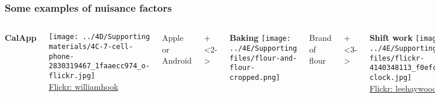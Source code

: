 \begin{frame}\frametitle{Some examples of nuisance factors}
	\begin{columns}[t]
			\textbf{CalApp}
			
			\texttt{[image: ../4D/Supporting materials/4C-7-cell-phone-2830319467\_1faaecc974\_o-flickr.jpg]}
			\\
			{\tiny{\href{https://secure.flickr.com/photos/williamhook/2830319467/}{Flickr: williamhook}}}
			
			\vspace{1cm}
			Apple or Android 
		
		
			\onslide+<2->{
				\textbf{Baking}
				\texttt{[image: ../4E/Supporting files/flour-and-flour-cropped.png]}
		
				\vspace{1.1cm}
				Brand of flour
			}
			
			\onslide+<3->{
				\textbf{Shift work}
				\texttt{[image: ../4E/Supporting files/flickr-4140348113\_f0efc8235b\_z-clock.jpg]}
				\\
				{\tiny{\href{https://secure.flickr.com/photos/leehaywood/4140348113}{Flickr: leehaywood}}}
				
				
				
				\vspace{0.8cm}
				Day shift or night shift
			}
		
			\onslide+<4->{
				\textbf{Gas mileage}
				
				\texttt{[image: ../4D/Supporting materials/4C-6-gas-mileage.png]}
				
				\vspace{1.65cm}
				Driver 1 or driver 2
			}
			
	\end{columns}
			
\end{frame}

